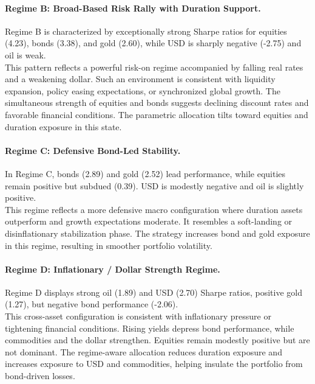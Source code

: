 \documentclass[11pt]{article}
\begin{document}
\paragraph{Regime B: Broad-Based Risk Rally with Duration Support.}

Regime B is characterized by exceptionally strong Sharpe ratios for equities (4.23), bonds (3.38), and gold (2.60), while USD is sharply negative (-2.75) and oil is weak.\\
This pattern reflects a powerful risk-on regime accompanied by falling real rates and a weakening dollar. Such an environment is consistent with liquidity expansion, policy easing expectations, or synchronized global growth. The simultaneous strength of equities and bonds suggests declining discount rates and favorable financial conditions. The parametric allocation tilts toward equities and duration exposure in this state.

\paragraph{Regime C: Defensive Bond-Led Stability.}

In Regime C, bonds (2.89) and gold (2.52) lead performance, while equities remain positive but subdued (0.39). USD is modestly negative and oil is slightly positive.\\
This regime reflects a more defensive macro configuration where duration assets outperform and growth expectations moderate. It resembles a soft-landing or disinflationary stabilization phase. The strategy increases bond and gold exposure in this regime, resulting in smoother portfolio volatility.

\paragraph{Regime D: Inflationary / Dollar Strength Regime.}

Regime D displays strong oil (1.89) and USD (2.70) Sharpe ratios, positive gold (1.27), but negative bond performance (-2.06).\\
This cross-asset configuration is consistent with inflationary pressure or tightening financial conditions. Rising yields depress bond performance, while commodities and the dollar strengthen. Equities remain modestly positive but are not dominant. The regime-aware allocation reduces duration exposure and increases exposure to USD and commodities, helping insulate the portfolio from bond-driven losses.
\end{document}
